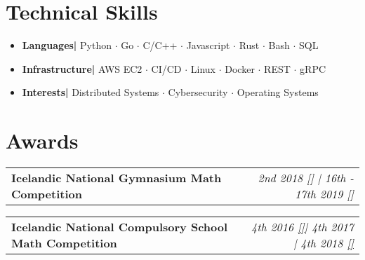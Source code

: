 \documentclass{article}
\makeatletter
\newcommand{\resumeItem}[2]{
  \item{
    \textbf{#1}{\hspace{0.5mm}#2 \vspace{-0.5mm}}
  }
}
\newcommand{\resumeProject}[2]{
\vspace{3mm}
    \begin{tabular*}{0.99\textwidth}[t]{l@{\extracolsep{\fill}}r}
        \textbf{#1} & \textit{\normalsize{#2}}
    \end{tabular*}
    \vspace{-2.5mm}
}
\newcommand{\resumeAward}[2]{
\vspace{3mm}
    \begin{tabular*}{0.99\textwidth}[t]{l@{\extracolsep{\fill}}r}
        \textbf{#1} & \textit{\normalsize{#2}} \\
    \end{tabular*}
    \vspace{-2mm}
}
\newcommand{\resumeSubItem}[2]{\resumeItem{#1}{#2}\vspace{-4pt}}
\newcommand{\resumeSubHeadingListStart}{}
\newcommand{\resumeHeadingSkillStart}{\vspace{4mm}\begin{itemize}[leftmargin=*,itemsep=1mm, rightmargin=2ex]}
\newcommand{\resumeSubHeadingListEnd}{}
\newcommand{\resumeHeadingSkillEnd}{\end{itemize}\vspace{-3mm}}
\makeatother
\begin{document}
\resumeSubHeadingListEnd

\section{\textbf{Technical Skills}}
 \resumeHeadingSkillStart
 \resumeSubItem{Languages| }
    {Python $\cdot$ 
	Go $\cdot$ 
	C/C++ $\cdot$  
	Javascript $\cdot$
	Rust $\cdot$ 
	Bash $\cdot$
	SQL %
	}

	\resumeSubItem{Infrastructure| }
    {AWS EC2 $\cdot$ 
	CI/CD $\cdot$ 
	Linux $\cdot$ 
	Docker $\cdot$ 
	REST $\cdot$ 
	gRPC %
	}

	\resumeSubItem{Interests| }
	{Distributed Systems $\cdot$ 
	Cybersecurity $\cdot$ 
	Operating Systems %
	}

 \resumeHeadingSkillEnd

\section{\textbf{Awards}}
\resumeSubHeadingListStart




\resumeAward
  {Icelandic National Gymnasium Math Competition}
  {2nd 2018 {}[\href{https://www.stae.is/stak/keppnin2018}{\textcolor{black}{\faIcon{globe}}}] | \textit{16th - 17th 2019 {}[\href{https://www.stae.is/stak/keppnin2019}{\textcolor{black}{\faIcon{globe}}}]}}

\resumeAward
	{Icelandic National Compulsory School Math Competition}
	{\textit{4th 2016 \href{http://www.lagafellsskoli.is/forsida/frettir/frett/2016/03/17/Staerdfraedikeppni-grunnskolanna-a-elsta-stigi/}{[\faGlobe]}}| \textit{4th 2017} | \textit{4th 2018 \href{http://www.lagafellsskoli.is/forsida/frettir/frett/2018/04/10/Urslit-staerdfraedikeppni-grunnskolanna-2018/}{[\faGlobe]}}}


\resumeSubHeadingListEnd
\end{document}
